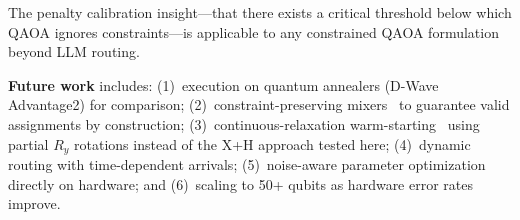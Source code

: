 \documentclass[conference]{IEEEtran}
\begin{document}
The penalty calibration insight---that there exists a critical threshold below which QAOA ignores constraints---is applicable to any constrained QAOA formulation beyond LLM routing.

\textbf{Future work} includes: (1)~execution on quantum annealers (D-Wave Advantage2) for comparison; (2)~constraint-preserving mixers~\cite{hadfield2019qaoa} to guarantee valid assignments by construction; (3)~continuous-relaxation warm-starting~\cite{egger2021warmstart} using partial $R_y$ rotations instead of the X+H approach tested here; (4)~dynamic routing with time-dependent arrivals; (5)~noise-aware parameter optimization directly on hardware; and (6)~scaling to 50+ qubits as hardware error rates improve.

\end{document}
